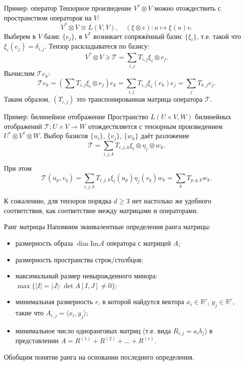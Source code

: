 \documentclass[handout]{beamer}
\renewcommand\ge{\geqslant}
\newcommand\R{\mathbb R}
\begin{document}
\begin{frame}{Пример: оператор}
    Тензорное произведение $V^*\otimes V$ можно отождествить с пространством
    операторов на $V$:
    $$
    V^*\otimes V \cong L(V,V),\quad (\xi\otimes v)\colon u\mapsto \xi(u)v.
    $$
    \pause
    Выберем в $V$ базис $\{e_j\}$, в $V^*$ возникает сопряжённый базис
    $\{\xi_i\}$, т.е. такой что $\xi_i(e_j)=\delta_{i,j}$. Тензор раскладыватеся
    по базису:
    $$
    V^*\otimes V \ni \mathcal T = \sum_{i,j} T_{i,j}\xi_i\otimes e_j.
    $$
    \pause
    Вычислим $\mathcal Te_k$:
    $$
    \mathcal Te_k = (\sum T_{i,j}\xi_i\otimes e_j)e_k = \sum_{i,j}
    T_{i,j}\xi_i(e_k)e_j = \sum_j T_{k,j}e_j.
    $$
    \pause
    Таким образом, $(T_{i,j})$ это транспонированная матрица оператора $\mathcal T$.
\end{frame}


\begin{frame}{Пример: билинейное отображение}
    Пространство $L(U\times V,W)$ билинейных отображений $\mathcal T\colon U\times V\to
    W$ отождествляется с тензорным произведением $U^*\otimes V^* \otimes W$.
    Выбор базисов $\{u_i\}$, $\{v_j\}$, $\{w_k\}$ даёт разложение
    $$
    \mathcal T = \sum_{i,j,k}T_{i,j,k}\xi_i\otimes \eta_j\otimes w_k.
    $$
    \pause\vspace{5pt}

    При этом 
    $$
    \mathcal T(u_p,v_q) = \sum_{i,j,k}T_{i,j,k}\xi_i(u_p)\eta_j(v_q)w_k = \sum_k
    T_{p,q,k}w_k.
    $$
    \pause\vspace{5pt}

    К сожалению, для тензоров порядка $d\ge3$ нет настолько же удобного
    соответствия, как соответствие между матрицами и операторами.
\end{frame}

\begin{frame}{Ранг матрицы}
    Напомним эквивалентные определения ранга матрицы:
    \begin{itemize}
        \item размерность образа $\dim\mathrm{Im}\mathcal A$ оператора с
            матрицей $A$;\pause
        \item размерность пространства строк/столбцов;\pause
        \item максимальный размер невырожденного минора:
            $\max\{|I|=|J|\colon \det A[I,J]\ne 0\}$;
        \item минимальная размерность $r$, в которой найдутся вектора
            $x_i\in\R^r$, $y_j\in\R^r$, такие что $A_{i,j}=\langle
            x_i,y_j\rangle$;
        \item минимальное число одноранговых матриц (т.е. вида $R_{i,j}=a_ib_j$)
            в представлении $A=R^{(1)}+R^{(2)}+\ldots+R^{(r)}$.
    \end{itemize}
    \pause\vspace{5pt}
    Обобщим понятие ранга на основании последнего определения.
\end{frame}
\end{document}
